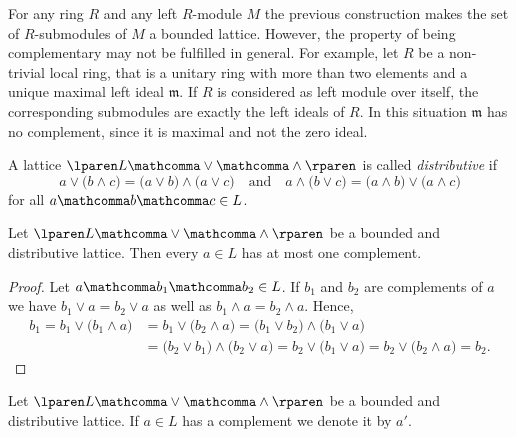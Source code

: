 \begin{remark}
  For any ring $R$ and any left $R$-module $M$
  the previous construction makes the set of $R$-submodules of $M$
  a bounded lattice.
  However, the property of being complementary may not be fulfilled in general.
  For example, let $R$ be a non-trivial local ring,
  that is a unitary ring with more than two elements
  and a unique maximal left ideal $\mathfrak{m}$.
  If $R$ is considered as left module over itself,
  the corresponding submodules are exactly the left ideals of $R$.
  In this situation $\mathfrak{m}$ has no complement,
  since it is maximal and not the zero ideal.
\end{remark}

\begin{definition}
  A lattice
  $\lparen L \mathcomma \vee \mathcomma \wedge \rparen$
  is called \emph{distributive} if
  \[
    a \vee \lparen b \wedge c \rparen
    \equal
    \lparen a \vee b \rparen  \wedge \lparen a \vee c \rparen
    \quad \text{and} \quad
    a \wedge \lparen b \vee c \rparen
    \equal
    \lparen a \wedge b \rparen \vee \lparen a \wedge c \rparen
  \]
  for all $a \mathcomma b \mathcomma c \in L$.
\end{definition}

\begin{proposition}
\label{prop:complements}
  Let
  $\lparen L \mathcomma \vee \mathcomma \wedge \rparen$
  be a bounded and distributive lattice.
  Then every $a \in L$ has at most one complement.
\end{proposition}

\begin{proof}
  Let $a \mathcomma b_1 \mathcomma b_2 \in L$.
  If $b_1$ and $b_2$ are complements of $a$ we have
  $b_1 \vee a \equal b_2 \vee a$
  as well as
  $b_1 \wedge a \equal b_2 \wedge a$.
  Hence,
  \begin{align*}
    b_1
    \equal
    b_1 \vee \lparen b_1 \wedge a \rparen
    &\equal
    b_1 \vee \lparen b_2 \wedge a \rparen
    \equal
    \lparen b_1 \vee b_2 \rparen \wedge \lparen b_1 \vee a \rparen \\
    &\equal
    \lparen b_2 \vee b_1 \rparen \wedge \lparen b_2 \vee a \rparen
    \equal
    b_2 \vee \lparen b_1 \vee a \rparen
    \equal
    b_2 \vee \lparen b_2 \wedge a \rparen
    \equal
    b_2.
  \end{align*}
\end{proof}

\begin{definition}
  Let
  $\lparen L \mathcomma \vee \mathcomma \wedge \rparen$
  be a bounded and distributive lattice.
  If $a \in L$ has a complement
  we denote it by $a \prime$.
\end{definition}

